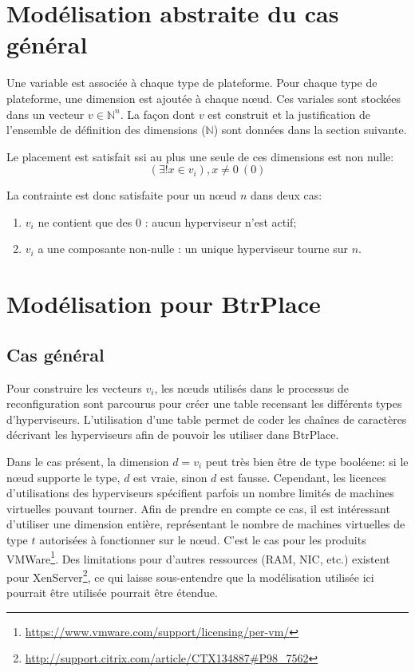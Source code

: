 \documentclass[a4paper]{article}
\begin{document}
\section{Modélisation abstraite du cas général}
Une variable est associée à chaque type de plateforme.
Pour chaque type de plateforme, une dimension est ajoutée à chaque
nœud. Ces variales sont stockées dans un vecteur
$v \in \mathbb{N}^n$. La façon dont $v$ est construit et la justification
de l'ensemble de définition des dimensions ($\mathbb{N}$) sont données
dans la section suivante.

Le placement est satisfait ssi au plus une seule de ces dimensions est
non nulle:
\[
	(\exists ! x \in v_i), x \neq 0\ (0)
\]

La contrainte est donc satisfaite pour un nœud $n$ dans deux cas:
\begin{enumerate}
	\item $v_i$ ne contient que des $0$ : aucun hyperviseur n'est actif;
	\item $v_i$ a une composante non-nulle : un unique hyperviseur tourne sur $n$.
\end{enumerate}

\section{Modélisation pour BtrPlace}
\subsection{Cas général}
Pour construire les vecteurs $v_i$, les nœuds utilisés dans le
processus de reconfiguration sont parcourus pour créer une table recensant les
différents types d'hyperviseurs. L'utilisation d'une table permet de coder
les chaînes de caractères décrivant les hyperviseurs afin de pouvoir les
utiliser dans BtrPlace.

Dans le cas présent, la dimension $d=v_i$ peut très bien être de type booléene:
si le nœud supporte le type, $d$ est vraie, sinon $d$ est fausse.
Cependant, les licences d'utilisations des hyperviseurs spécifient
parfois un nombre limités de machines virtuelles pouvant tourner. Afin
de prendre en compte ce cas, il est intéressant d'utiliser une dimension
entière, représentant le nombre de machines virtuelles de type $t$
autorisées à fonctionner sur le nœud. C'est le cas pour les produits
VMWare\footnote{\url{https://www.vmware.com/support/licensing/per-vm/}}.
Des limitations pour d'autres ressources (RAM, NIC, etc.) existent pour
XenServer\footnote{\url{http://support.citrix.com/article/CTX134887\#P98\_7562}},
ce qui laisse sous-entendre que la modélisation utilisée ici pourrait
être utilisée pourrait être étendue.
\end{document}
